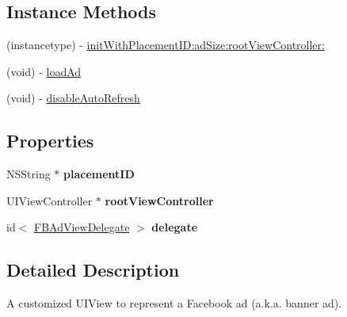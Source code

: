 \subsection*{Instance Methods}
\begin{DoxyCompactItemize}
\item 
(instancetype) -\/ \hyperlink{interface_f_b_ad_view_a18d8d708c909cab8cea3fdad22085b83}{init\-With\-Placement\-I\-D\-:ad\-Size\-:root\-View\-Controller\-:}
\item 
(void) -\/ \hyperlink{interface_f_b_ad_view_acb5962ac98e3645dd53893d98d5b9564}{load\-Ad}
\item 
(void) -\/ \hyperlink{interface_f_b_ad_view_a58fb951b1562f0d295a08134462b4f3c}{disable\-Auto\-Refresh}
\end{DoxyCompactItemize}
\subsection*{Properties}
\begin{DoxyCompactItemize}
\item 
\hypertarget{interface_f_b_ad_view_a79b3c8801ce58b2c094c9b4b8e53ae61}{N\-S\-String $\ast$ {\bfseries placement\-I\-D}}\label{interface_f_b_ad_view_a79b3c8801ce58b2c094c9b4b8e53ae61}

\item 
\hypertarget{interface_f_b_ad_view_a173345093a26a4f668e005f3a3e5c19a}{U\-I\-View\-Controller $\ast$ {\bfseries root\-View\-Controller}}\label{interface_f_b_ad_view_a173345093a26a4f668e005f3a3e5c19a}

\item 
\hypertarget{interface_f_b_ad_view_a1e85a3b5844a5e8ba9ea538d538e77c9}{id$<$ \hyperlink{protocol_f_b_ad_view_delegate-p}{F\-B\-Ad\-View\-Delegate} $>$ {\bfseries delegate}}\label{interface_f_b_ad_view_a1e85a3b5844a5e8ba9ea538d538e77c9}

\end{DoxyCompactItemize}


\subsection{Detailed Description}
A customized U\-I\-View to represent a Facebook ad (a.\-k.\-a. banner ad). 

